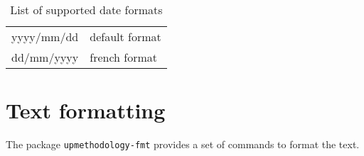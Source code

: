 \documentclass[book,taskpackage,specpackage,codepackage]{upmethodology-document}
\begin{document}
\begin{table}[ht]
	\begin{center}
		\begin{tabular}{|>{\ttfamily}l|l|}
		\hline
		yyyy/mm/dd & default format \\
		dd/mm/yyyy & french format \\
		\hline
		\end{tabular}
	\end{center}
	\caption{List of supported date formats}
	\label{tab:date.formats}
\end{table}

\section{Text formatting}

The package \texttt{upmethodology-fmt} provides a set of commands to format the text.
\end{document}
